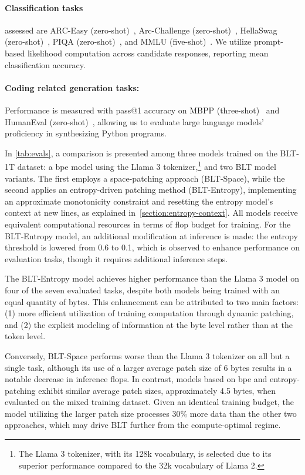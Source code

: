 \paragraph{Classification tasks} assessed are ARC-Easy (zero-shot)~\citep{Eval_ARC}, Arc-Challenge (zero-shot)~\citep{Eval_ARC}, HellaSwag (zero-shot)~\citep{Eval_hellaswag}, PIQA (zero-shot)~\citep{Eval_piqa}, and MMLU (five-shot)~\citep{hendrycks2020measuring}. We utilize prompt-based likelihood computation across candidate responses, reporting mean classification accuracy.
\paragraph{Coding related generation tasks:}  Performance is measured with pass@1 accuracy on MBPP (three-shot)~\citep{Eval_MBPP} and HumanEval (zero-shot)~\citep{Eval_HumanEval}, allowing us to evaluate large language models' proficiency in synthesizing Python programs.

In \autoref{tab:evals}, a comparison is presented among three models trained on the {\textsc BLT}-1T dataset: a bpe model using the Llama 3 tokenizer,\footnote{The Llama 3 tokenizer, with its 128k vocabulary, is selected due to its superior performance compared to the 32k vocabulary of Llama 2.} and two {\textsc BLT} model variants. The first employs a space-patching approach ({\textsc BLT}-Space), while the second applies an entropy-driven patching method ({\textsc BLT}-Entropy), implementing an approximate monotonicity constraint and resetting the entropy model's context at new lines, as explained in~\autoref{section:entropy-context}. All models receive equivalent computational resources in terms of flop budget for training. For the {\textsc BLT}-Entropy model, an additional modification at inference is made: the entropy threshold is lowered from 0.6 to 0.1, which is observed to enhance performance on evaluation tasks, though it requires additional inference steps.

The {\textsc BLT}-Entropy model achieves higher performance than the Llama 3 model on four of the seven evaluated tasks, despite both models being trained with an equal quantity of bytes. This enhancement can be attributed to two main factors: (1) more efficient utilization of training computation through dynamic patching, and (2) the explicit modeling of information at the byte level rather than at the token level.

Conversely, {\textsc BLT}-Space performs worse than the Llama 3 tokenizer on all but a single task, although its use of a larger average patch size of 6 bytes results in a notable decrease in inference flops. In contrast, models based on bpe and entropy-patching exhibit similar average patch sizes, approximately 4.5 bytes, when evaluated on the mixed training dataset. Given an identical training budget, the model utilizing the larger patch size processes 30\% more data than the other two approaches, which may drive {\textsc BLT} further from the compute-optimal regime.

